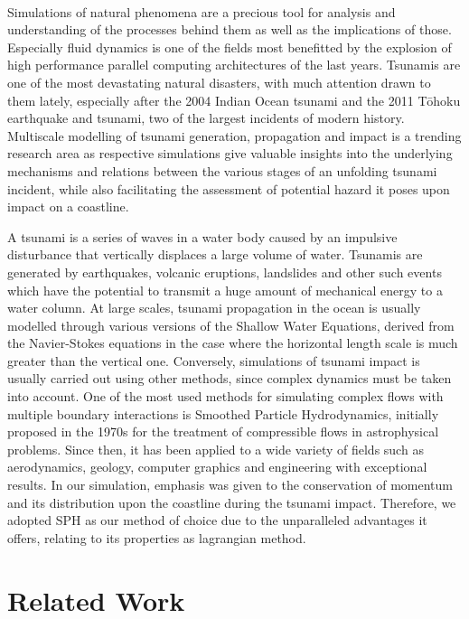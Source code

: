 \documentclass{llncs}
\begin{document}
\paragraph{} Simulations of natural phenomena are a precious tool for analysis and
understanding of the processes behind them as well as the implications of
those. Especially fluid dynamics is one of the fields most benefitted by the explosion of
high performance parallel computing architectures of the last years. Tsunamis are one of
the most devastating natural disasters, with much attention drawn to them lately,
especially after the 2004 Indian Ocean tsunami and the 2011 T\={o}hoku earthquake and
tsunami, two of the largest incidents of modern history. Multiscale modelling of tsunami
generation, propagation and impact is a trending research area as respective simulations
give valuable insights into the underlying mechanisms and relations between the various
stages of an unfolding tsunami incident, while also facilitating the assessment of
potential hazard it poses upon impact on a coastline.

A tsunami is a series of waves in a water body caused by an impulsive disturbance that
vertically displaces a large volume of water. Tsunamis are generated by earthquakes,
volcanic eruptions, landslides and other such events which have the potential to transmit
a huge amount of mechanical energy to a water column. At large scales, tsunami propagation
in the ocean is usually modelled through various versions of the Shallow Water Equations,
derived from the Navier-Stokes equations in the case where the horizontal length scale is
much greater than the vertical one. Conversely, simulations of tsunami impact is usually
carried out using other methods, since complex dynamics must be taken into account. One of
the most used methods for simulating complex flows with multiple boundary interactions is
Smoothed Particle Hydrodynamics, initially proposed in the 1970s for the treatment of
compressible flows in astrophysical problems. Since then, it has been applied to a wide
variety of fields such as aerodynamics, geology, computer graphics and engineering with
exceptional results. In our simulation, emphasis was given to the conservation of momentum
and its distribution upon the coastline during the tsunami impact. Therefore, we adopted
SPH as our method of choice due to the unparalleled advantages it offers, relating to its
properties as lagrangian method.

\section{Related Work}
\end{document}
